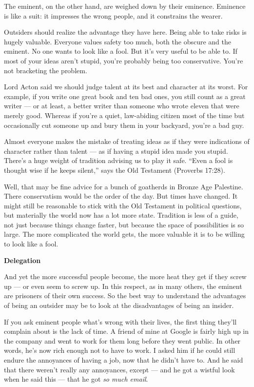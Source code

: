 \documentclass[12pt]{book}
\begin{document}
The eminent, on the other hand, are weighed down by their eminence.
Eminence is like a suit: it impresses the wrong people, and it
constrains the wearer.

Outsiders should realize the advantage they have here. Being able to
take risks is hugely valuable. Everyone values safety too much, both the
obscure and the eminent. No one wants to look like a fool. But it's very
useful to be able to. If most of your ideas aren't stupid, you're
probably being too conservative. You're not bracketing the problem.

Lord Acton said we should judge talent at its best and character at its
worst. For example, if you write one great book and ten bad ones, you
still count as a great writer --- or at least, a better writer than
someone who wrote eleven that were merely good. Whereas if you're a
quiet, law-abiding citizen most of the time but occasionally cut someone
up and bury them in your backyard, you're a bad guy.

Almost everyone makes the mistake of treating ideas as if they were
indications of character rather than talent --- as if having a stupid
idea made you stupid. There's a huge weight of tradition advising us to
play it safe. ``Even a fool is thought wise if he keeps silent,'' says
the Old Testament (Proverbs 17:28).

Well, that may be fine advice for a bunch of goatherds in Bronze Age
Palestine. There conservatism would be the order of the day. But times
have changed. It might still be reasonable to stick with the Old
Testament in political questions, but materially the world now has a lot
more state. Tradition is less of a guide, not just because things change
faster, but because the space of possibilities is so large. The more
complicated the world gets, the more valuable it is to be willing to
look like a fool.

\textbf{Delegation}

And yet the more successful people become, the more heat they get if
they screw up --- or even seem to screw up. In this respect, as in many
others, the eminent are prisoners of their own success. So the best way
to understand the advantages of being an outsider may be to look at the
disadvantages of being an insider.

If you ask eminent people what's wrong with their lives, the first thing
they'll complain about is the lack of time. A friend of mine at Google
is fairly high up in the company and went to work for them long before
they went public. In other words, he's now rich enough not to have to
work. I asked him if he could still endure the annoyances of having a
job, now that he didn't have to. And he said that there weren't really
any annoyances, except --- and he got a wistful look when he said this
--- that he got \emph{so much email}.
\end{document}
